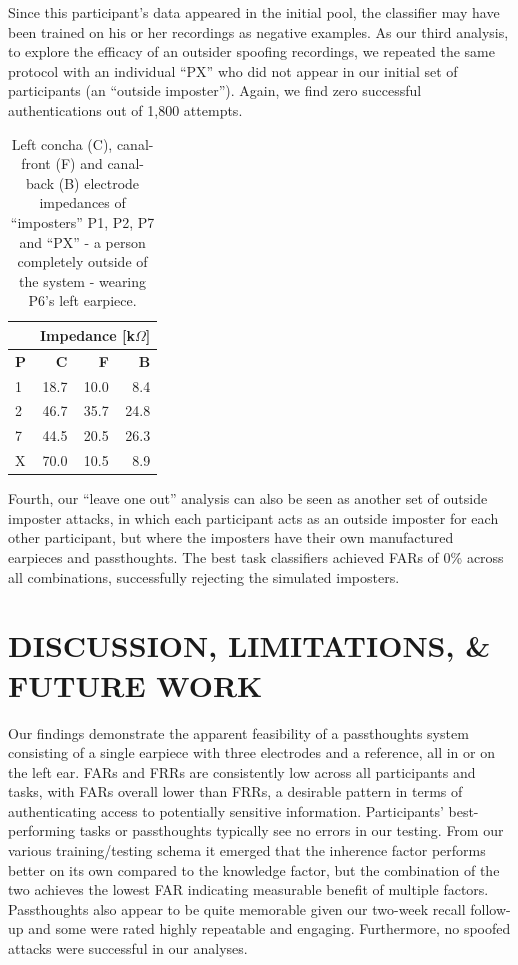 \documentclass[a4paper,twoside]{article}
\begin{document}
Since this participant's data appeared in the initial pool, the classifier may have been trained on his or her recordings as negative examples. As our third analysis, to explore the efficacy of an outsider spoofing recordings, we repeated the same protocol with an individual ``PX'' who did not appear in our initial set of participants (an ``outside imposter''). Again, we find zero successful authentications out of 1,800 attempts.

\begin{table}[h]
\caption{Left concha (C), canal-front (F) and canal-back (B) electrode impedances of ``imposters'' P1, P2, P7 and ``PX'' - a person completely outside of the system - wearing P6's left earpiece.}
\label{tab:imposter_impedances}
\begin{center}
\begin{tabular}{lrrr}
& \multicolumn{3}{c}{Impedance [k\(\Omega\)]} \\
\hline
\textbf{P} & \textbf{C} & \textbf{F} & \textbf{B} \\
1 & 18.7 & 10.0 & 8.4\\
2 & 46.7 & 35.7 & 24.8\\
7 & 44.5 & 20.5 & 26.3\\
X & 70.0 & 10.5 & 8.9\\
\end{tabular}
\end{center}
\end{table}

Fourth, our ``leave one out'' analysis can also be seen as another set of outside imposter attacks, in which each participant acts as an outside imposter for each other participant, but where the imposters have their own manufactured earpieces and passthoughts. The best task classifiers achieved FARs of 0\% across all combinations, successfully rejecting the simulated imposters.

\section{\uppercase{Discussion, Limitations, \& Future Work}}
\label{sec:discussion}

\noindent Our findings demonstrate the apparent feasibility of a passthoughts system consisting of a single earpiece with three electrodes and a reference, all in or on the left ear. FARs and FRRs are consistently low across all participants and tasks, with FARs overall lower than FRRs, a desirable pattern in terms of authenticating access to potentially sensitive information. Participants' best-performing tasks or passthoughts typically see no errors in our testing. From our various training/testing schema it emerged that the inherence factor performs better on its own compared to the knowledge factor, but the combination of the two achieves the lowest FAR indicating measurable benefit of multiple factors. Passthoughts also appear to be quite memorable given our two-week recall follow-up and some were rated highly repeatable and engaging. Furthermore, no spoofed attacks were successful in our analyses. 
\end{document}
